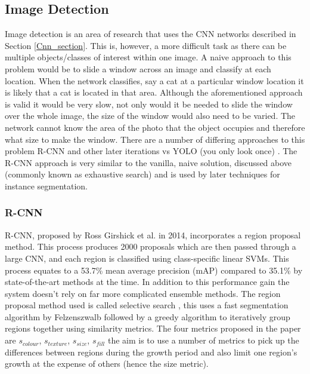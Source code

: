 \documentclass[a4paper,11pt,notitlepage]{article}
\begin{document}
\subsection{Image Detection} \label{Image_det}
Image detection is an area of research that uses the CNN networks described in Section \ref{Cnn_section}. This is, however, a more difficult task as there can be multiple objects/classes of interest within one image. A naive approach to this problem would be to slide a window across an image and classify at each location. When the network classifies, say a cat at a particular window location it is likely that a cat is located in that area.
\newline \newline
Although the aforementioned approach is valid it would be very slow, not only would it be needed to slide the window over the whole image, the size of the window would also need to be varied. The network cannot know the area of the photo that the object occupies and therefore what size to make the window. There are a number of differing approaches to this problem R-CNN \cite{DBLP:journals/corr/GirshickDDM13} and other later iterations vs YOLO (you only look once) \cite{DBLP:journals/corr/RedmonDGF15}. The R-CNN approach is very similar to the vanilla, naive solution, discussed above (commonly known as exhaustive search) and is used by later techniques for instance segmentation.


\subsubsection{R-CNN} \label{rcnn}
R-CNN, proposed by Ross Girshick et al. \cite{DBLP:journals/corr/GirshickDDM13} in 2014, incorporates a region proposal method. This process produces 2000 proposals which are then passed through a large CNN, and each region is classified using class-specific linear SVMs. This process equates to a 53.7\% mean average precision (mAP) compared to 35.1\% by state-of-the-art methods at the time. In addition to this performance gain the system doesn't rely on far more complicated ensemble methods.
\newline \newline
The region proposal method used is called selective search \cite{Uijlings2013}, this uses a fast segmentation algorithm by Felzenszwalb \cite{Felzenszwalb2004} followed by a greedy algorithm to iteratively group regions together using similarity metrics. The four metrics proposed in the paper are $s_{colour}$, $s_{texture}$, $s_{size}$, $s_{fill}$  the aim is to use a number of metrics to pick up the differences between regions during the growth period and also limit one region's growth at the expense of others (hence the size metric).
\end{document}

